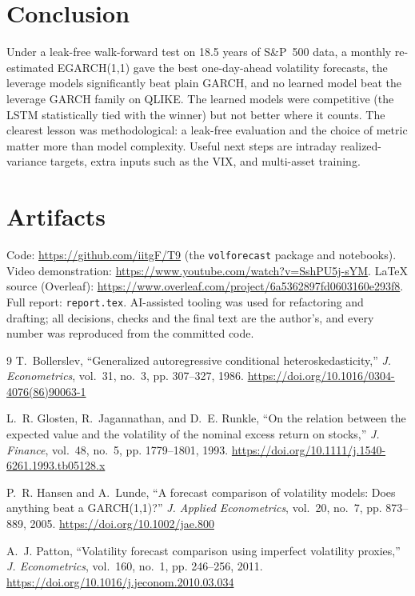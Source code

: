 \documentclass[a4paper,twocolumn,10pt]{article}
\begin{document}
\section{Conclusion}
Under a leak-free walk-forward test on 18.5 years of S\&P~500 data, a monthly re-estimated EGARCH(1,1) gave the best one-day-ahead volatility forecasts, the leverage models significantly beat plain GARCH, and no learned model beat the leverage GARCH family on QLIKE. The learned models were competitive (the LSTM statistically tied with the winner) but not better where it counts. The clearest lesson was methodological: a leak-free evaluation and the choice of metric matter more than model complexity. Useful next steps are intraday realized-variance targets, extra inputs such as the VIX, and multi-asset training.

\section{Artifacts}
Code: \url{https://github.com/iitgF/T9} (the \texttt{volforecast} package and notebooks). Video demonstration: \url{https://www.youtube.com/watch?v=SshPU5j-sYM}. LaTeX source (Overleaf): \url{https://www.overleaf.com/project/6a5362897fd0603160e293f8}. Full report: \texttt{report.tex}. AI-assisted tooling was used for refactoring and drafting; all decisions, checks and the final text are the author's, and every number was reproduced from the committed code.

\begin{thebibliography}{9}
\small
{}
T.~Bollerslev, ``Generalized autoregressive conditional heteroskedasticity,'' \textit{J. Econometrics}, vol.~31, no.~3, pp. 307--327, 1986. \url{https://doi.org/10.1016/0304-4076(86)90063-1}

L.~R. Glosten, R.~Jagannathan, and D.~E. Runkle, ``On the relation between the expected value and the volatility of the nominal excess return on stocks,'' \textit{J. Finance}, vol.~48, no.~5, pp. 1779--1801, 1993. \url{https://doi.org/10.1111/j.1540-6261.1993.tb05128.x}

P.~R. Hansen and A.~Lunde, ``A forecast comparison of volatility models: Does anything beat a GARCH(1,1)?'' \textit{J. Applied Econometrics}, vol.~20, no.~7, pp. 873--889, 2005. \url{https://doi.org/10.1002/jae.800}

A.~J. Patton, ``Volatility forecast comparison using imperfect volatility proxies,'' \textit{J. Econometrics}, vol.~160, no.~1, pp. 246--256, 2011. \url{https://doi.org/10.1016/j.jeconom.2010.03.034}
\end{thebibliography}
\end{document}
